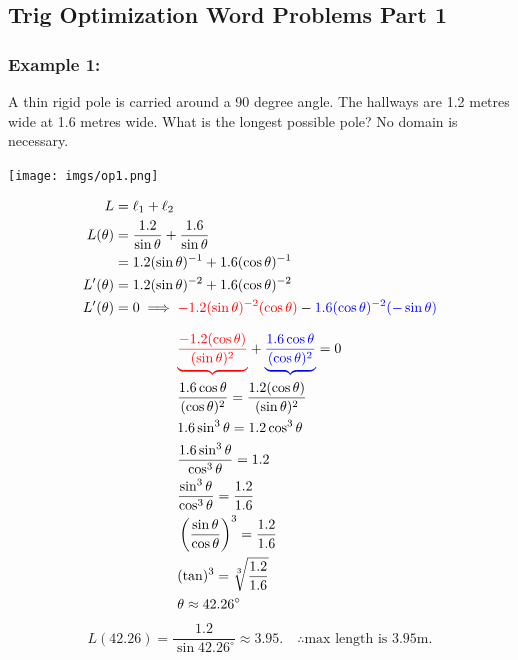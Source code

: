 \documentclass{article}
\begin{document}
\subsection{Trig Optimization Word Problems Part 1}
\subsubsection*{Example 1:}
A thin rigid pole is carried around a 90 degree angle. The hallways are 1.2 metres wide at 1.6 metres wide. What is the longest possible pole? No domain is necessary.


\begin{minipage}{0.5\textwidth}
  \centering
  \texttt{[image: imgs/op1.png]}
\end{minipage}%
\begin{minipage}{0.5\textwidth}
\begin{align*}
    L &= \ell_1 + \ell_2 \\
    L(\theta) &= \frac{1.2}{\sin \theta} + \frac{1.6}{\sin \theta} \\
              &= 1.2(\sin \theta)^{-1} + 1.6(\cos \theta)^{-1} \\
    L'(\theta) &= 1.2(\sin \theta)^{-2} + 1.6(\cos \theta)^{-2} \\
    L'(\theta) &= 0 \implies \textcolor{red}{-1.2(\sin \theta)^{-2}(\cos \theta)} - \textcolor{blue}{1.6(\cos \theta)^{-2}(-\sin \theta)} \\
\end{align*}
\end{minipage}

\begin{align*}
    & \textcolor{red}{\underbrace{\frac{-1.2(\cos \theta )}{(\sin \theta)^2}}} + \textcolor{blue}{\underbrace{\frac{1.6 \cos \theta }{(\cos \theta)^2}}} = 0 \\
    & \frac{1.6 \cos \theta }{(\cos \theta)^2} = \frac{1.2(\cos \theta )}{(\sin \theta)^2} \\
    & 1.6 \sin^3\theta = 1.2 \cos ^3 \theta \\
    & \frac{1.6 \sin^3 \theta}{\cos ^3\theta} = 1.2 \\
    & \frac{\sin^3 \theta}{\cos ^3\theta} = \frac{1.2}{1.6} \\
    & \left(\frac{\sin \theta }{\cos \theta}\right)^3 = \frac{1.2}{1.6} \\
    & (\tan)^3 = \sqrt[3]{\frac{1.2}{1.6}} \\
    & \theta \approx 42.26^{\circ}
\end{align*}
\[
L(42.26) = \frac{1.2}{\sin 42.26^{\circ}} \approx 3.95. \quad \therefore \text{max length is 3.95m.}
\]
\newpage
\end{document}
